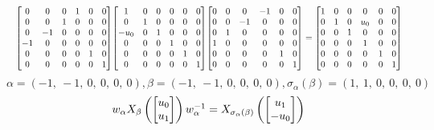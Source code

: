 \documentclass[11pt]{article}
\theoremstyle{definition}
\begin{document}
\[
\scaletoalign{\textwidth}{{\left[\begin{matrix}0 & 0 & 0 & 1 & 0 & 0\\0 & 0 & 1 & 0 & 0 & 0\\0 & -1 & 0 & 0 & 0 & 0\\-1 & 0 & 0 & 0 & 0 & 0\\0 & 0 & 0 & 0 & 1 & 0\\0 & 0 & 0 & 0 & 0 & 1\end{matrix}\right]} {\left[\begin{matrix}1 & 0 & 0 & 0 & 0 & 0\\0 & 1 & 0 & 0 & 0 & 0\\- u_{0} & 0 & 1 & 0 & 0 & 0\\0 & 0 & 0 & 1 & 0 & 0\\0 & 0 & 0 & 0 & 1 & 0\\0 & 0 & 0 & 0 & 0 & 1\end{matrix}\right]} {\left[\begin{matrix}0 & 0 & 0 & -1 & 0 & 0\\0 & 0 & -1 & 0 & 0 & 0\\0 & 1 & 0 & 0 & 0 & 0\\1 & 0 & 0 & 0 & 0 & 0\\0 & 0 & 0 & 0 & 1 & 0\\0 & 0 & 0 & 0 & 0 & 1\end{matrix}\right]} = {\left[\begin{matrix}1 & 0 & 0 & 0 & 0 & 0\\0 & 1 & 0 & u_{0} & 0 & 0\\0 & 0 & 1 & 0 & 0 & 0\\0 & 0 & 0 & 1 & 0 & 0\\0 & 0 & 0 & 0 & 1 & 0\\0 & 0 & 0 & 0 & 0 & 1\end{matrix}\right]}}
\]
\[
\alpha = \left( -1, \  -1, \  0, \  0, \  0, \  0\right), \beta = \left( -1, \  -1, \  0, \  0, \  0, \  0\right), \sigma_{\alpha}(\beta) = \left( 1, \  1, \  0, \  0, \  0, \  0\right)
\]
\[
\scaletoalign{\textwidth}{w_{\alpha} X_{\beta}\left(\left[\begin{matrix}u_{0}\\u_{1}\end{matrix}\right]\right) w_{\alpha}^{-1} = X_{\sigma_{\alpha}\left(\beta\right)}\left(\left[\begin{matrix}u_{1}\\- u_{0}\end{matrix}\right]\right)}
\]
\end{document}
